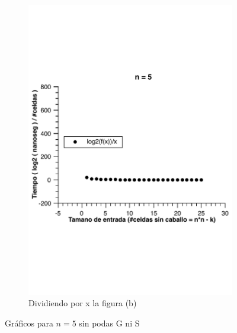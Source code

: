 \begin{figure}[H]
        \begin{subfigure}[b]{0.5\textwidth}
                \includegraphics[width=\textwidth]{imagenes/grafico3-n-5-div-log.pdf}
                \caption{Dividiendo por x la figura (b)}
        \end{subfigure}
        \caption{Gráficos para $n=5$ sin podas G ni S}
\end{figure}

